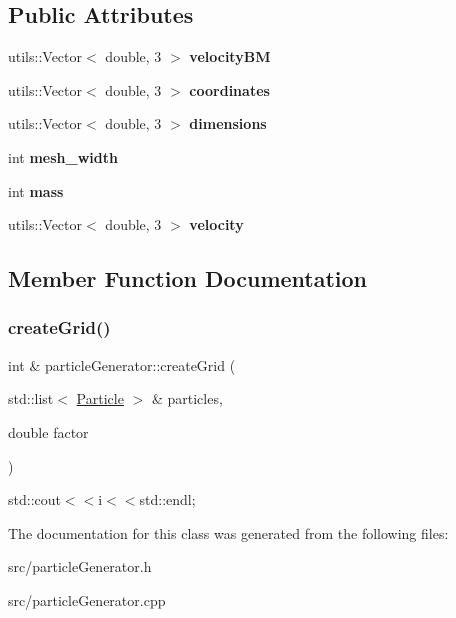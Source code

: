 \subsection*{Public Attributes}
\begin{DoxyCompactItemize}
\item 
\mbox{\label{classparticle_generator_ab80e773221f217a33d4b1be568e83c38}} 
utils\+::\+Vector$<$ double, 3 $>$ {\bfseries velocity\+BM}
\item 
\mbox{\label{classparticle_generator_a5871f5ebe841c2b1c5fb1f2204301ae6}} 
utils\+::\+Vector$<$ double, 3 $>$ {\bfseries coordinates}
\item 
\mbox{\label{classparticle_generator_a9732889f7714a7ffc9c534a9f4697743}} 
utils\+::\+Vector$<$ double, 3 $>$ {\bfseries dimensions}
\item 
\mbox{\label{classparticle_generator_a2495fe784adc4df5efe64792aba897c1}} 
int {\bfseries mesh\+\_\+width}
\item 
\mbox{\label{classparticle_generator_ace647dfea1735c36a0201aa389985b16}} 
int {\bfseries mass}
\item 
\mbox{\label{classparticle_generator_ac186888d269707c311d5721b4ad9a0c5}} 
utils\+::\+Vector$<$ double, 3 $>$ {\bfseries velocity}
\end{DoxyCompactItemize}


\subsection{Member Function Documentation}
\mbox{\label{classparticle_generator_a15769993d769d9ca466eb5d68f3acad2}} 
\subsubsection{\texorpdfstring{create\+Grid()}{createGrid()}}
{\footnotesize\ttfamily int \& particle\+Generator\+::create\+Grid (\begin{DoxyParamCaption}\item[{std\+::list$<$ \mbox{\hyperlink{class_particle}{Particle}} $>$ \&}]{particles,  }\item[{double}]{factor }\end{DoxyParamCaption})}

std\+::cout$<$$<$i$<$$<$std\+::endl; 

The documentation for this class was generated from the following files\+:\begin{DoxyCompactItemize}
\item 
src/particle\+Generator.\+h\item 
src/particle\+Generator.\+cpp\end{DoxyCompactItemize}
